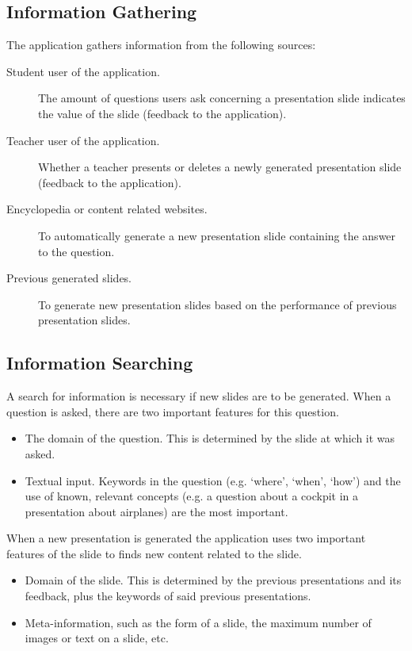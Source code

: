 \documentclass[11pt]{article}
\begin{document}
\subsection{Information Gathering}
The application gathers information from the following sources:
\begin{description}
\item[Student user of the application.] The amount of questions users ask concerning a presentation slide indicates the value of the slide (feedback to the application).
\item[Teacher user of the application.] Whether a teacher presents or deletes a newly generated presentation slide (feedback to the application).
\item[Encyclopedia or content related websites.] To automatically generate a new presentation slide containing the answer to the question.
\item[Previous generated slides.] To generate new presentation slides based on the performance of previous presentation slides.
\end{description}

\subsection{Information Searching}
A search for information is necessary if new slides are to be generated. When a question is asked, there are two important features for this question.
\begin{itemize}
\item The domain of the question. This is determined by the slide at which it was asked. 
\item Textual input. Keywords in the question (e.g. `where', `when', `how') and the use of known, relevant concepts (e.g. a question about a cockpit in a presentation about airplanes) are the most important.
\end{itemize}
When a new presentation is generated the application uses two important features of the slide to finds new content related to the slide.
\begin{itemize}
\item Domain of the slide. This is determined by the previous presentations and its feedback, plus the keywords of said previous presentations.
\item Meta-information, such as the form of a slide, the maximum number of images or text on a slide, etc.
\end{itemize}
\end{document}
